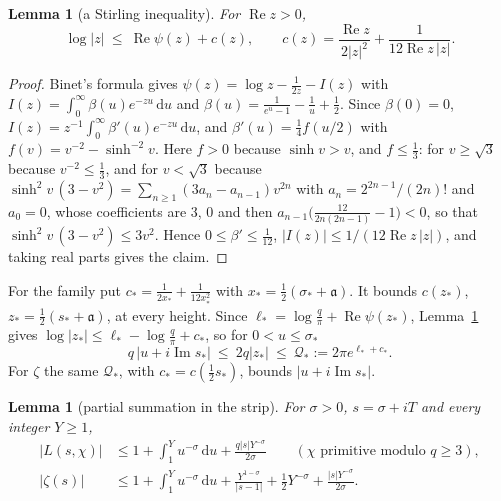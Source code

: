 \documentclass[11pt]{article}
\newtheorem{lemma}[theorem]{Lemma}
\theoremstyle{definition}
\theoremstyle{remark}
\newcommand{\dd}{\,\mathrm d}
\newcommand{\fa}{\mathfrak a}
\newcommand{\re}{\operatorname{Re}}
\newcommand{\im}{\operatorname{Im}}
\numberwithin{equation}{section}
\begin{document}
\begin{lemma}[a Stirling inequality]\label{lem:stirling}
For $\re z>0$,
\[
\log\lvert z\rvert\ \le\ \re\psi(z)+c(z),\qquad c(z)=\frac{\re z}{2\lvert z\rvert^2}+\frac1{12\re z\,\lvert z\rvert}.
\]
\end{lemma}

\begin{proof}
Binet's formula \cite[Section~5.9(ii)]{dlmf} gives
$\psi(z)=\log z-\frac1{2z}-I(z)$ with $I(z)=\int_0^\infty\beta(u)e^{-zu}\dd u$
and $\beta(u)=\frac1{e^u-1}-\frac1u+\frac12$. Since $\beta(0)=0$,
$I(z)=z^{-1}\int_0^\infty\beta'(u)e^{-zu}\dd u$, and
$\beta'(u)=\frac14f(u/2)$ with $f(v)=v^{-2}-\sinh^{-2}v$. Here $f>0$
because $\sinh v>v$, and $f\le\frac13$: for $v\ge\sqrt3$ because
$v^{-2}\le\frac13$, and for $v<\sqrt3$ because
$\sinh^2v\,(3-v^2)=\sum_{n\ge1}(3a_n-a_{n-1})v^{2n}$ with
$a_n=2^{2n-1}/(2n)!$ and $a_0=0$, whose coefficients are $3$, $0$ and then
$a_{n-1}\bigl(\frac{12}{2n(2n-1)}-1\bigr)<0$, so that
$\sinh^2v\,(3-v^2)\le3v^2$. Hence $0\le\beta'\le\frac1{12}$,
$\lvert I(z)\rvert\le1/(12\re z\,\lvert z\rvert)$, and taking real parts
gives the claim.
\end{proof}

For the family put $c_*=\frac1{2x_*}+\frac1{12x_*^2}$ with
$x_*=\frac12(\sigma_*+\fa)$. It bounds $c(z_*)$, $z_*=\frac12(s_*+\fa)$, at
every height. Since $\ell_*=\log\frac q\pi+\re\psi(z_*)$,
Lemma~\ref{lem:stirling} gives $\log\lvert z_*\rvert\le\ell_*-\log\frac q\pi+c_*$,
so for $0<u\le\sigma_*$
\begin{equation}\label{eq:Qstar}
q\,\lvert u+i\im s_*\rvert\ \le\ 2q\lvert z_*\rvert\ \le\ \mathcal Q_*:=2\pi e^{\ell_*+c_*}.
\end{equation}
For $\zeta$ the same $\mathcal Q_*$, with $c_*=c(\frac12s_*)$, bounds
$\lvert u+i\im s_*\rvert$.

\begin{lemma}[partial summation in the strip]\label{lem:partial}
For $\sigma>0$, $s=\sigma+iT$ and every integer $Y\ge1$,
\begin{align*}
\lvert L(s,\chi)\rvert&\le1+\int_1^Yu^{-\sigma}\dd u+\frac{q\lvert s\rvert Y^{-\sigma}}{2\sigma}
\qquad(\chi\text{ primitive modulo }q\ge3),\\
\lvert\zeta(s)\rvert&\le1+\int_1^Yu^{-\sigma}\dd u+\frac{Y^{1-\sigma}}{\lvert s-1\rvert}+\frac12Y^{-\sigma}+\frac{\lvert s\rvert Y^{-\sigma}}{2\sigma}.
\end{align*}
\end{lemma}
\end{document}
